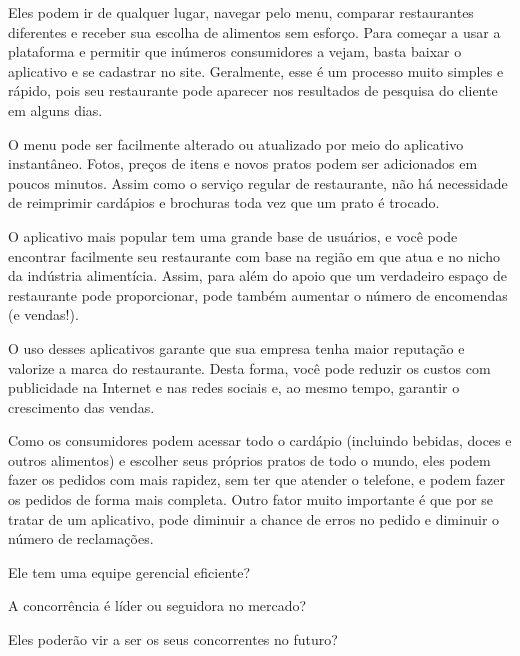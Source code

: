 Eles podem ir de qualquer lugar, navegar pelo menu, comparar restaurantes diferentes e receber sua escolha de alimentos sem esforço. Para começar a usar a plataforma e permitir que inúmeros consumidores a vejam, basta baixar o aplicativo e se cadastrar no site. Geralmente, esse é um processo muito simples e rápido, pois seu restaurante pode aparecer nos resultados de pesquisa do cliente em alguns dias.\par

O menu pode ser facilmente alterado ou atualizado por meio do aplicativo instantâneo. Fotos, preços de itens e novos pratos podem ser adicionados em poucos minutos. Assim como o serviço regular de restaurante, não há necessidade de reimprimir cardápios e brochuras toda vez que um prato é trocado.\par

O aplicativo mais popular tem uma grande base de usuários, e você pode encontrar facilmente seu restaurante com base na região em que atua e no nicho da indústria alimentícia. Assim, para além do apoio que um verdadeiro espaço de restaurante pode proporcionar, pode também aumentar o número de encomendas (e vendas!).\par

O uso desses aplicativos garante que sua empresa tenha maior reputação e valorize a marca do restaurante. Desta forma, você pode reduzir os custos com publicidade na Internet e nas redes sociais e, ao mesmo tempo, garantir o crescimento das vendas.\par

Como os consumidores podem acessar todo o cardápio (incluindo bebidas, doces e outros alimentos) e escolher seus próprios pratos de todo o mundo, eles podem fazer os pedidos com mais rapidez, sem ter que atender o telefone, e podem fazer os pedidos de forma mais completa. Outro fator muito importante é que por se tratar de um aplicativo, pode diminuir a chance de erros no pedido e diminuir o número de reclamações.\par


\begin{commentA}
Ele tem uma equipe gerencial eficiente?
\par \end{commentA}



\begin{commentA}
A concorrência é líder ou seguidora no mercado?
\par \end{commentA}



\begin{commentA}
Eles poderão vir a ser os seus concorrentes no futuro?
\par \end{commentA}




























